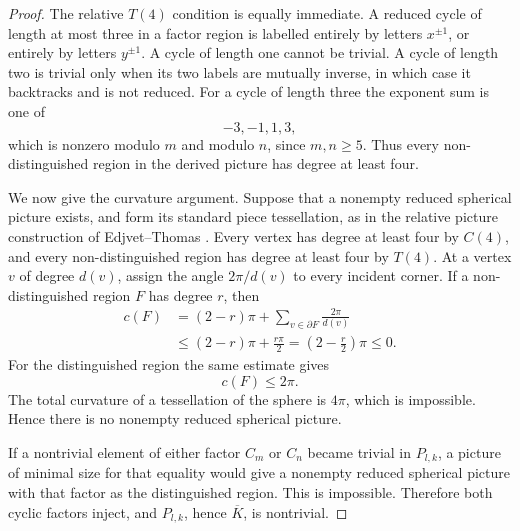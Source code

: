 \documentclass{article}
\begin{document}
\begin{proof}
The relative \(T(4)\) condition is equally immediate.  A reduced cycle
of length at most three in a factor region is labelled entirely by
letters \(x^{\pm1}\), or entirely by letters \(y^{\pm1}\).  A cycle of
length one cannot be trivial.  A cycle of length two is trivial only
when its two labels are mutually inverse, in which case it backtracks
and is not reduced.  For a cycle of length three the exponent sum is
one of
\[
 -3,-1,1,3,
\]
which is nonzero modulo \(m\) and modulo \(n\), since \(m,n\geq5\).
Thus every non-distinguished region in the derived picture has degree
at least four.

We now give the curvature argument.  Suppose that a nonempty reduced
spherical picture exists, and form its standard piece tessellation, as
in the relative picture construction of Edjvet--Thomas
\cite[Sections~3--4]{ET}.  Every vertex has degree at least four by
\(C(4)\), and every non-distinguished region has degree at least four
by \(T(4)\).  At a vertex \(v\) of degree \(d(v)\), assign the angle
\(2\pi/d(v)\) to every incident corner.  If a non-distinguished region
\(F\) has degree \(r\), then
\[
\begin{aligned}
 c(F)
 &=(2-r)\pi+\sum_{v\in\partial F}\frac{2\pi}{d(v)}\\
 &\leq(2-r)\pi+\frac{r\pi}{2}
  =\left(2-\frac r2\right)\pi
 \leq0.
\end{aligned}
\]
For the distinguished region the same estimate gives
\[
 c(F)\leq2\pi.
\]
The total curvature of a tessellation of the sphere is \(4\pi\), which
is impossible.  Hence there is no nonempty reduced spherical picture.

If a nontrivial element of either factor \(C_m\) or \(C_n\) became
trivial in \(P_{l,k}\), a picture of minimal size for that equality
would give a nonempty reduced spherical picture with that factor as
the distinguished region.  This is impossible.  Therefore both cyclic
factors inject, and \(P_{l,k}\), hence \(\overline K\), is nontrivial.
\end{proof}
\end{document}
